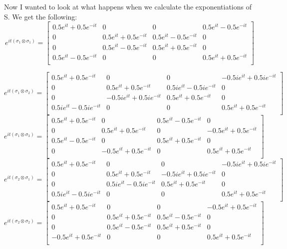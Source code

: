 \documentclass{article}
\begin{document}
Now I wanted to look at what happens when we calculate the exponentiations of S. We get the following: 
\[ e^{it(\sigma_1 \otimes \sigma_1)} = \left[
    \begin{array}{cccc}
    0.5e^{it} + 0.5e^{-it} & 0 & 0 & 0.5e^{it} - 0.5e^{-it} \\
    0 & 0.5e^{it} + 0.5e^{-it} & 0.5e^{it} - 0.5e^{-it} & 0 \\
    0 & 0.5e^{it} - 0.5e^{-it} & 0.5e^{it} + 0.5e^{-it} & 0 \\
    0.5e^{it} - 0.5e^{-it} & 0 & 0 & 0.5e^{it} + 0.5e^{-it} \\
    \end{array}
    \right] \]

\[ e^{it(\sigma_1 \otimes \sigma_2)} = \left[
    \begin{array}{cccc}
    0.5e^{it} + 0.5e^{-it} & 0 & 0 & -0.5ie^{it} + 0.5ie^{-it} \\
    0 & 0.5e^{it} + 0.5e^{-it} & 0.5ie^{it} - 0.5ie^{-it} & 0 \\
    0 & -0.5ie^{it} + 0.5ie^{-it} & 0.5e^{it} + 0.5e^{-it} & 0 \\
    0.5ie^{it} - 0.5ie^{-it} & 0 & 0 & 0.5e^{it} + 0.5e^{-it} \\
    \end{array}
    \right] \]
\[ e^{it(\sigma_1 \otimes \sigma_3)} = \left[
    \begin{array}{cccc}
    0.5e^{it} + 0.5e^{-it} & 0 & 0.5e^{it} - 0.5e^{-it} & 0 \\
    0 & 0.5e^{it} + 0.5e^{-it} & 0 & -0.5e^{it} + 0.5e^{-it} \\
    0.5e^{it} - 0.5e^{-it} & 0 & 0.5e^{it} + 0.5e^{-it} & 0 \\
    0 & -0.5e^{it} + 0.5e^{-it} & 0 & 0.5e^{it} + 0.5e^{-it} \\
    \end{array}
    \right] \] 
\[ e^{it(\sigma_2 \otimes \sigma_1)} = \left[
    \begin{array}{cccc}
    0.5e^{it} + 0.5e^{-it} & 0 & 0 & -0.5ie^{it} + 0.5ie^{-it} \\
    0 & 0.5e^{it} + 0.5e^{-it} & -0.5ie^{it} + 0.5ie^{-it} & 0 \\
    0 & 0.5ie^{it} - 0.5ie^{-it} & 0.5e^{it} + 0.5e^{-it} & 0 \\
    0.5ie^{it} - 0.5ie^{-it} & 0 & 0 & 0.5e^{it} + 0.5e^{-it} \\
    \end{array}
    \right] \] 
\[ e^{it(\sigma_2 \otimes \sigma_2)} = \left[
    \begin{array}{cccc}
    0.5e^{it} + 0.5e^{-it} & 0 & 0 & -0.5e^{it} + 0.5e^{-it} \\
    0 & 0.5e^{it} + 0.5e^{-it} & 0.5e^{it} - 0.5e^{-it} & 0 \\
    0 & 0.5e^{it} - 0.5e^{-it} & 0.5e^{it} + 0.5e^{-it} & 0 \\
    -0.5e^{it} + 0.5e^{-it} & 0 & 0 & 0.5e^{it} + 0.5e^{-it} \\
    \end{array}
    \right] \] 
\end{document}
